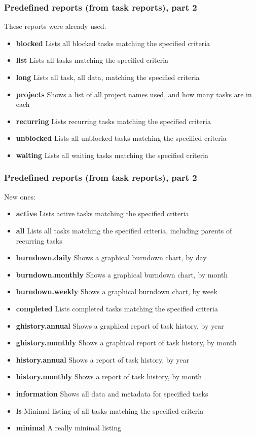 \documentclass[t,handout]{beamer}
\begin{document}
\begin{frame}
\frametitle{Predefined reports (from task reports), part 2}

These reports were already used.

\begin{itemize}
\item \textbf{blocked}          Lists all blocked tasks matching the specified criteria
\item \textbf{list}             Lists all tasks matching the specified criteria
\item \textbf{long}             Lists all task, all data, matching the specified criteria
\item \textbf{projects}         Shows a list of all project names used, and how many tasks are in each
\item \textbf{recurring}        Lists recurring tasks matching the specified criteria
\item \textbf{unblocked}        Lists all unblocked tasks matching the specified criteria
\item \textbf{waiting}          Lists all waiting tasks matching the specified criteria
\end{itemize}
\end{frame}

\begin{frame}
\frametitle{Predefined reports (from task reports), part 2}

New ones:

\begin{itemize}
\item \textbf{active}           Lists active tasks matching the specified criteria
\item \textbf{all}              Lists all tasks matching the specified criteria, including parents of recurring tasks
\item \textbf{burndown.daily}   Shows a graphical burndown chart, by day
\item \textbf{burndown.monthly} Shows a graphical burndown chart, by month
\item \textbf{burndown.weekly}  Shows a graphical burndown chart, by week
\item \textbf{completed}        Lists completed tasks matching the specified criteria
\item \textbf{ghistory.annual}  Shows a graphical report of task history, by year
\item \textbf{ghistory.monthly} Shows a graphical report of task history, by month
\item \textbf{history.annual}   Shows a report of task history, by year
\item \textbf{history.monthly}  Shows a report of task history, by month
\item \textbf{information}      Shows all data and metadata for specified tasks
\item \textbf{ls}               Minimal listing of all tasks matching the specified criteria
\item \textbf{minimal}          A really minimal listing
\end{itemize}
\end{frame}
\end{document}
